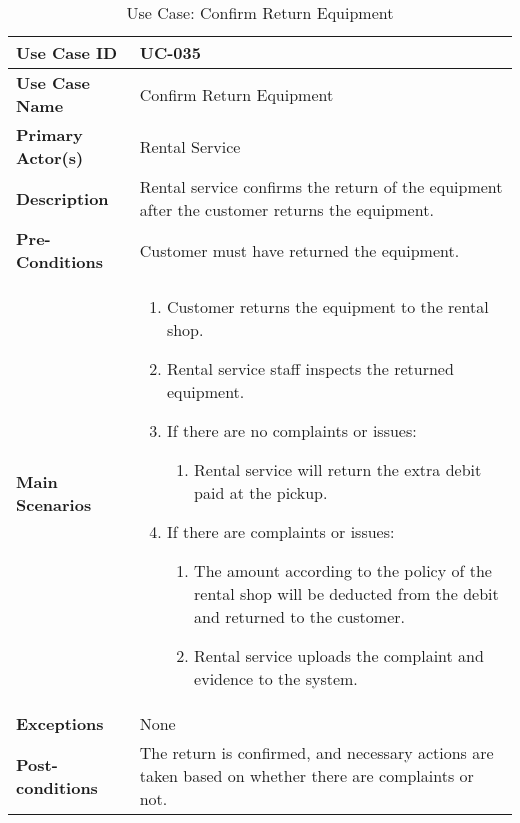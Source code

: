 \begin{table}[ht]
    \centering
    \begin{tabular}{|l|p{}|}
        \hline
        \textbf{Use Case ID} & UC-035 \\
        \hline
        \textbf{Use Case Name} & Confirm Return Equipment \\
        \hline
        \textbf{Primary Actor(s)} & Rental Service \\
        \hline
        \textbf{Description} & Rental service confirms the return of the equipment after the customer returns the equipment. \\
        \hline
        \textbf{Pre-Conditions} & Customer must have returned the equipment. \\
        \hline
        \textbf{Main Scenarios} & 
        \begin{enumerate}[label=\arabic*.,itemsep=0pt]
            \item Customer returns the equipment to the rental shop.
            \item Rental service staff inspects the returned equipment.
            \item If there are no complaints or issues:
                \begin{enumerate}[label=\alph*.,itemsep=0pt]
                    \item Rental service will return the extra debit paid at the pickup.
                \end{enumerate}
            \item If there are complaints or issues:
                \begin{enumerate}[label=\alph*.,itemsep=0pt]
                    \item The amount according to the policy of the rental shop will be deducted from the debit and returned to the customer.
                    \item Rental service uploads the complaint and evidence to the system.
                \end{enumerate}
        \end{enumerate} \\
        \hline
        \textbf{Exceptions} & None \\
        \hline
        \textbf{Post-conditions} & The return is confirmed, and necessary actions are taken based on whether there are complaints or not. \\
        \hline
    \end{tabular}
    \label{tab:use-case-confirm-return-equipment}
    \caption{Use Case: Confirm Return Equipment}
\end{table}


